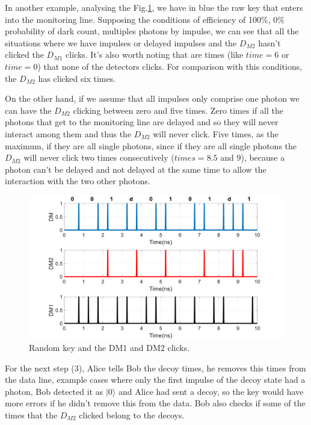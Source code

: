 \begin{refsection}
In another example, analysing the Fig.\ref{fig:dm3}, we have in blue the raw key that enters into the monitoring line. Supposing the conditions of efficiency of 100\%, 0\% probability of dark count, multiples photons by impulse, we can see that all the situations where we have impulses or delayed impulses and the $D_{M2}$ hasn't clicked the $D_{M1}$ clicks. It's also worth noting that are times (like $time=6$ or $time=0$) that none of the detectors clicks. For comparison with this conditions, the $D_{M2}$ has clicked six times.

On the other hand, if we assume that all impulses only comprise one photon we can have the $D_{M2}$ clicking between zero and five times. Zero times if all the photons that get to the monitoring line are delayed and so they will never interact among them and thus the $D_{M2}$ will never click. Five times, as the maximum, if they are all single photons, since if they are all single photons the $D_{M2}$ will never click two times consecutively ($times=8.5$ and $9$), because a photon can't be delayed and not delayed at the same time to allow the interaction with the two other photons.

\begin{figure}[hbt!]
\centering
\includegraphics[width=1\textwidth]{./sdf/tq_76558_cow_protocol/slides/figures/DM3.pdf}
\caption{Random key and the DM1 and DM2 clicks.}
\label{fig:dm3}
\end{figure}

For the next step (3), Alice tells Bob the decoy times, he removes this times from the data line, example cases where only the first impulse of the decoy state had a photon, Bob detected it as $|0\rangle$ and Alice had sent a decoy, so the key would have more errors if he didn't remove this from the data. Bob also checks if some of the times that the $D_{M2}$ clicked belong to the decoys.


\end{refsection}
